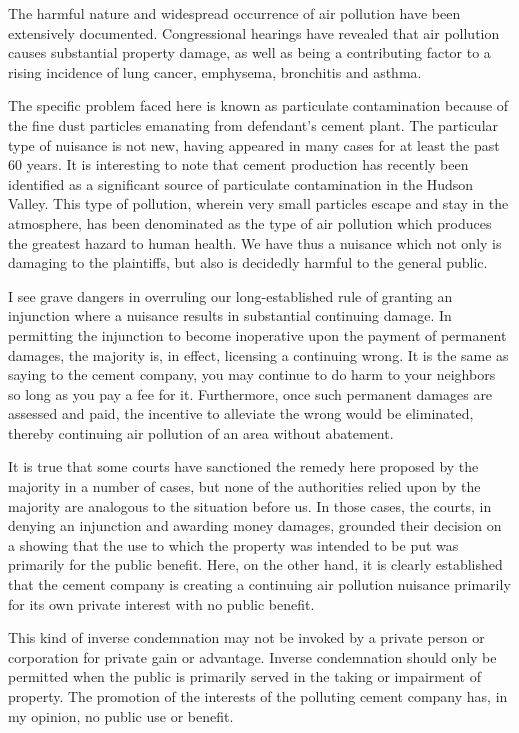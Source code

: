 The harmful nature and widespread occurrence of air pollution have been
extensively documented. Congressional hearings have revealed that air pollution
causes substantial property damage, as well as being a contributing factor to a
rising incidence of lung cancer, emphysema, bronchitis and asthma.

The specific problem faced here is known as particulate contamination because of
the fine dust particles emanating from defendant's cement plant. The particular
type of nuisance is not new, having appeared in many cases for at least the past
60 years. It is interesting to note that cement production has recently been
identified as a significant source of particulate contamination in the Hudson
Valley. This type of pollution, wherein very small particles escape and stay in
the atmosphere, has been denominated as the type of air pollution which produces
the greatest hazard to human health. We have thus a nuisance which not only is
damaging to the plaintiffs, but also is
decidedly harmful to the general public.

I see grave dangers in overruling our long-established rule of granting an
injunction where a nuisance results in substantial continuing damage. In
permitting the injunction to become inoperative upon the payment of permanent
damages, the majority is, in effect, licensing a continuing wrong. It is the
same as saying to the cement company, you may continue to do harm to your
neighbors so long as you pay a fee for it. Furthermore, once such permanent
damages are assessed and paid, the incentive to alleviate the wrong would be
eliminated, thereby continuing air pollution of an area without abatement.

It is true that some courts have sanctioned the remedy here proposed by the
majority in a number of cases, but none of the authorities relied upon by the
majority are analogous to the situation before us. In those cases, the courts,
in denying an injunction and awarding money damages, grounded their decision on
a showing that the use to which the property was intended to be put was
primarily for the public benefit. Here, on the other hand, it is clearly
established that the cement company is creating a continuing air pollution
nuisance primarily for its own private interest with no public benefit.

This kind of inverse condemnation may not be invoked by a private person or
corporation for private gain or advantage. Inverse condemnation should only be
permitted when the public is primarily served in the taking or impairment of
property. The promotion of the interests of the polluting cement company has, in
my opinion, no public use or benefit.


